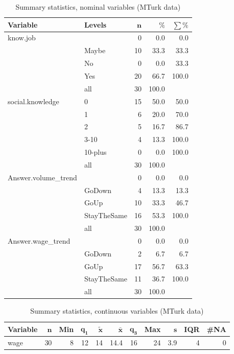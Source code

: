 \documentclass[a4paper,10pt]{article}\usepackage[]{graphicx}\usepackage[]{color}
\begin{document}
\begin{table}[ht]
\centering
{\footnotesize
\begin{tabular}{ll|rrr}
 \textbf{Variable} & \textbf{Levels} & $\mathbf{n}$ & $\mathbf{\%}$ & $\mathbf{\sum \%}$ \\ 
  \hline
know.job &  & 0 & 0.0 & 0.0 \\ 
   & Maybe & 10 & 33.3 & 33.3 \\ 
   & No & 0 & 0.0 & 33.3 \\ 
   & Yes & 20 & 66.7 & 100.0 \\ 
   \hline
 & all & 30 & 100.0 &  \\ 
   \hline
\hline
social.knowledge & 0 & 15 & 50.0 & 50.0 \\ 
   & 1 & 6 & 20.0 & 70.0 \\ 
   & 2 & 5 & 16.7 & 86.7 \\ 
   & 3-10 & 4 & 13.3 & 100.0 \\ 
   & 10-plus & 0 & 0.0 & 100.0 \\ 
   \hline
 & all & 30 & 100.0 &  \\ 
   \hline
\hline
Answer.volume\_trend &  & 0 & 0.0 & 0.0 \\ 
   & GoDown & 4 & 13.3 & 13.3 \\ 
   & GoUp & 10 & 33.3 & 46.7 \\ 
   & StayTheSame & 16 & 53.3 & 100.0 \\ 
   \hline
 & all & 30 & 100.0 &  \\ 
   \hline
\hline
Answer.wage\_trend &  & 0 & 0.0 & 0.0 \\ 
   & GoDown & 2 & 6.7 & 6.7 \\ 
   & GoUp & 17 & 56.7 & 63.3 \\ 
   & StayTheSame & 11 & 36.7 & 100.0 \\ 
   \hline
 & all & 30 & 100.0 &  \\ 
   \hline
\hline
\end{tabular}
}
\caption{Summary statistics, nominal variables (MTurk data)} 
\label{tab1:49-9090}
\end{table}
\begin{table}[ht]
\centering
{\footnotesize
\begin{tabular}{lrrrrrrrrrr}
 \textbf{Variable} & $\mathbf{n}$ & \textbf{Min} & $\mathbf{q_1}$ & $\mathbf{\widetilde{x}}$ & $\mathbf{\bar{x}}$ & $\mathbf{q_3}$ & \textbf{Max} & $\mathbf{s}$ & \textbf{IQR} & \textbf{\#NA} \\ 
  \hline
wage & 30 & 8 & 12 & 14 & 14.4 & 16 & 24 & 3.9 & 4 & 0 \\ 
  \end{tabular}
}
\caption{Summary statistics, continuous variables (MTurk data)} 
\label{tab2:49-9090}
\end{table}
\end{document}
